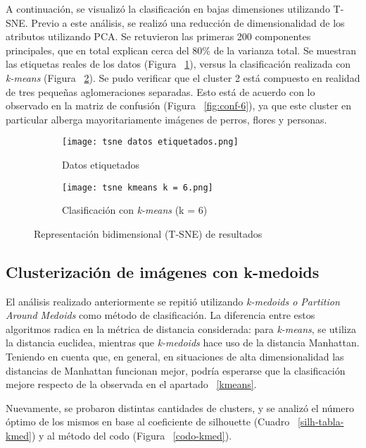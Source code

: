 \documentclass[journal,article,submit,pdftex,moreauthors]{Definitions/mdpi}
\begin{document}
A continuación, se visualizó la clasificación en bajas dimensiones utilizando T-SNE. Previo a este análisis, se realizó una reducción de dimensionalidad de los atributos utilizando PCA. Se retuvieron las primeras 200 componentes principales, que en total explican cerca del 80\% de la varianza total.  Se muestran las etiquetas reales de los datos (Figura ~\ref{fig:etiq}), versus la clasificación realizada con \textit{k-means} (Figura ~\ref{fig:tsne-kmeans}). Se pudo verificar que el cluster 2 está compuesto en realidad de tres pequeñas aglomeraciones separadas. Esto está de acuerdo con lo observado en la matriz de confusión (Figura ~\ref{fig:conf-6}), ya que este cluster en particular alberga mayoritariamente imágenes de perros, flores y personas.  

\begin{figure}[hbtp]

\begin{subfigure}{0.5\textwidth}
\texttt{[image: tsne datos etiquetados.png]} 
\captionsetup{justification=centering}
\caption{Datos etiquetados}
\label{fig:etiq}
\end{subfigure}
\begin{subfigure}{0.5\textwidth}
\texttt{[image: tsne kmeans k = 6.png]}
\captionsetup{justification=centering}
\caption{Clasificación con \textit{k-means} (k = 6)}
\label{fig:tsne-kmeans}
\end{subfigure}
\captionsetup{justification=centering}
\caption{Representación bidimensional (T-SNE) de resultados}
\label{tsne-kmeans}
\end{figure}

\subsection{Clusterización de imágenes con k-medoids}

El análisis realizado anteriormente se repitió utilizando \textit{k-medoids o Partition Around Medoids} como método de clasificación. La diferencia entre estos algoritmos radica en la métrica de distancia considerada: para \textit{k-means}, se utiliza la distancia euclidea, mientras que \textit{k-medoids} hace uso de la distancia Manhattan. Teniendo en cuenta que, en general, en situaciones de alta dimensionalidad las distancias de Manhattan funcionan mejor, podría esperarse que la clasificación mejore respecto de la observada en el apartado ~\ref{kmeans}. 

Nuevamente, se probaron distintas cantidades de clusters, y se analizó el número óptimo de los mismos en base al coeficiente de silhouette (Cuadro ~\ref{silh-tabla-kmed})  y al método del codo (Figura ~\ref{codo-kmed}).
\end{document}
